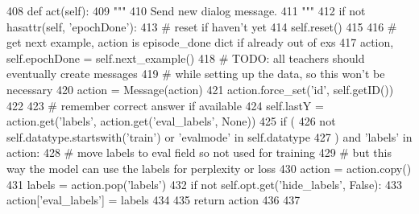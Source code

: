 \begin{DoxyCode}
408     \textcolor{keyword}{def }act(self):
409         \textcolor{stringliteral}{"""}
410 \textcolor{stringliteral}{        Send new dialog message.}
411 \textcolor{stringliteral}{        """}
412         \textcolor{keywordflow}{if} \textcolor{keywordflow}{not} hasattr(self, \textcolor{stringliteral}{'epochDone'}):
413             \textcolor{comment}{# reset if haven't yet}
414             self.reset()
415 
416         \textcolor{comment}{# get next example, action is episode\_done dict if already out of exs}
417         action, self.epochDone = self.next\_example()
418         \textcolor{comment}{# TODO: all teachers should eventually create messages}
419         \textcolor{comment}{# while setting up the data, so this won't be necessary}
420         action = Message(action)
421         action.force\_set(\textcolor{stringliteral}{'id'}, self.getID())
422 
423         \textcolor{comment}{# remember correct answer if available}
424         self.lastY = action.get(\textcolor{stringliteral}{'labels'}, action.get(\textcolor{stringliteral}{'eval\_labels'}, \textcolor{keywordtype}{None}))
425         \textcolor{keywordflow}{if} (
426             \textcolor{keywordflow}{not} self.datatype.startswith(\textcolor{stringliteral}{'train'}) \textcolor{keywordflow}{or} \textcolor{stringliteral}{'evalmode'} \textcolor{keywordflow}{in} self.datatype
427         ) \textcolor{keywordflow}{and} \textcolor{stringliteral}{'labels'} \textcolor{keywordflow}{in} action:
428             \textcolor{comment}{# move labels to eval field so not used for training}
429             \textcolor{comment}{# but this way the model can use the labels for perplexity or loss}
430             action = action.copy()
431             labels = action.pop(\textcolor{stringliteral}{'labels'})
432             \textcolor{keywordflow}{if} \textcolor{keywordflow}{not} self.opt.get(\textcolor{stringliteral}{'hide\_labels'}, \textcolor{keyword}{False}):
433                 action[\textcolor{stringliteral}{'eval\_labels'}] = labels
434 
435         \textcolor{keywordflow}{return} action
436 
437 
\end{DoxyCode}
\mbox{\label{classparlai_1_1core_1_1teachers_1_1FixedDialogTeacher_afa75426a7578e8aad5b74964219345be}} 
